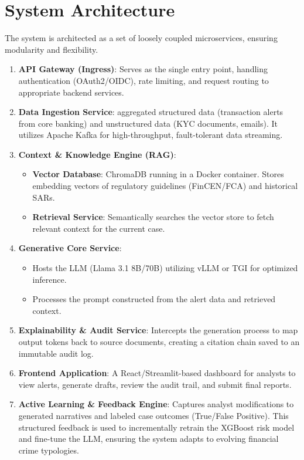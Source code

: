 \documentclass{article}
\begin{document}
\section{System Architecture}
The system is architected as a set of loosely coupled microservices, ensuring modularity and flexibility.
\begin{enumerate}
    \item \textbf{API Gateway (Ingress)}: Serves as the single entry point, handling authentication (OAuth2/OIDC), rate limiting, and request routing to appropriate backend services.
    \item \textbf{Data Ingestion Service}: aggregated structured data (transaction alerts from core banking) and unstructured data (KYC documents, emails). It utilizes Apache Kafka for high-throughput, fault-tolerant data streaming.
    \item \textbf{Context \& Knowledge Engine (RAG)}:
    \begin{itemize}
        \item \textbf{Vector Database}: ChromaDB running in a Docker container. Stores embedding vectors of regulatory guidelines (FinCEN/FCA) and historical SARs.
        \item \textbf{Retrieval Service}: Semantically searches the vector store to fetch relevant context for the current case.
    \end{itemize}
    \item \textbf{Generative Core Service}:
    \begin{itemize}
        \item Hosts the LLM (Llama 3.1 8B/70B) utilizing vLLM or TGI for optimized inference.
        \item Processes the prompt constructed from the alert data and retrieved context.
    \end{itemize}
    \item \textbf{Explainability \& Audit Service}: Intercepts the generation process to map output tokens back to source documents, creating a citation chain saved to an immutable audit log.
    \item \textbf{Frontend Application}: A React/Streamlit-based dashboard for analysts to view alerts, generate drafts, review the audit trail, and submit final reports.
    \item \textbf{Active Learning & Feedback Engine}: Captures analyst modifications to generated narratives and labeled case outcomes (True/False Positive). This structured feedback is used to incrementally retrain the XGBoost risk model and fine-tune the LLM, ensuring the system adapts to evolving financial crime typologies.
\end{enumerate}
\end{document}
